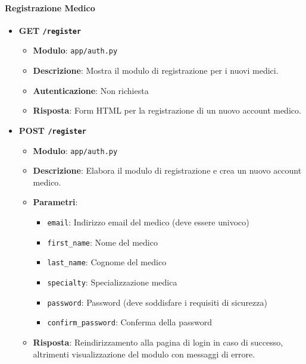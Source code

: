 \documentclass[12pt,a4paper,oneside]{report}
\begin{document}
\paragraph{Registrazione Medico}
\begin{itemize}
    \item \textbf{GET \texttt{/register}}
          \begin{itemize}
              \item \textbf{Modulo}: \texttt{app/auth.py}
              \item \textbf{Descrizione}: Mostra il modulo di registrazione per i nuovi medici.
              \item \textbf{Autenticazione}: Non richiesta
              \item \textbf{Risposta}: Form HTML per la registrazione di un nuovo account medico.
          \end{itemize}

    \item \textbf{POST \texttt{/register}}
          \begin{itemize}
              \item \textbf{Modulo}: \texttt{app/auth.py}
              \item \textbf{Descrizione}: Elabora il modulo di registrazione e crea un nuovo account medico.
              \item \textbf{Parametri}:
                    \begin{itemize}
                        \item \texttt{email}: Indirizzo email del medico (deve essere univoco)
                        \item \texttt{first\_name}: Nome del medico
                        \item \texttt{last\_name}: Cognome del medico
                        \item \texttt{specialty}: Specializzazione medica
                        \item \texttt{password}: Password (deve soddisfare i requisiti di sicurezza)
                        \item \texttt{confirm\_password}: Conferma della password
                    \end{itemize}
              \item \textbf{Risposta}: Reindirizzamento alla pagina di login in caso di successo, altrimenti visualizzazione del modulo con messaggi di errore.
          \end{itemize}
\end{itemize}
\end{document}
